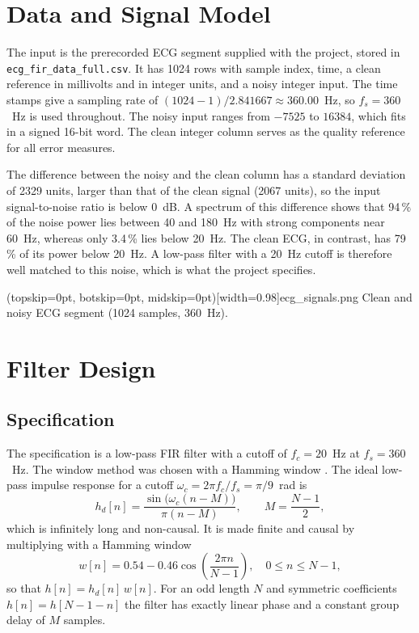 \documentclass{ieeeaccess}
\begin{document}
\section{Data and Signal Model}
\label{sec:data}
The input is the prerecorded ECG segment supplied with the project, stored in \texttt{ecg\_fir\_data\_full.csv}. It has 1024 rows with sample index, time, a clean reference in millivolts and in integer units, and a noisy integer input. The time stamps give a sampling rate of $(1024-1)/2.841667 \approx 360.00$~Hz, so $f_s = 360$~Hz is used throughout. The noisy input ranges from $-7525$ to $16384$, which fits in a signed 16-bit word. The clean integer column serves as the quality reference for all error measures.

The difference between the noisy and the clean column has a standard deviation of 2329 units, larger than that of the clean signal (2067 units), so the input signal-to-noise ratio is below 0~dB. A spectrum of this difference shows that 94\,\% of the noise power lies between 40 and 180~Hz with strong components near 60~Hz, whereas only 3.4\,\% lies below 20~Hz. The clean ECG, in contrast, has 79\,\% of its power below 20~Hz. A low-pass filter with a 20~Hz cutoff is therefore well matched to this noise, which is what the project specifies.

\Figure[t!](topskip=0pt, botskip=0pt, midskip=0pt)[width=0.98\columnwidth]{ecg_signals.png}
{Clean and noisy ECG segment (1024 samples, 360~Hz).\label{fig:signals}}

\section{Filter Design}
\label{sec:design}
\subsection{Specification}
The specification is a low-pass FIR filter with a cutoff of $f_c = 20$~Hz at $f_s = 360$~Hz. The window method \cite{b1} was chosen with a Hamming window \cite{b2}. The ideal low-pass impulse response for a cutoff $\omega_c = 2\pi f_c/f_s = \pi/9$~rad is
\begin{equation}
h_d[n] = \frac{\sin\!\big(\omega_c (n-M)\big)}{\pi (n-M)}, \qquad M = \frac{N-1}{2},
\end{equation}
which is infinitely long and non-causal. It is made finite and causal by multiplying with a Hamming window
\begin{equation}
w[n] = 0.54 - 0.46\cos\!\left(\frac{2\pi n}{N-1}\right), \quad 0 \le n \le N-1,
\end{equation}
so that $h[n] = h_d[n]\,w[n]$. For an odd length $N$ and symmetric coefficients $h[n]=h[N-1-n]$ the filter has exactly linear phase and a constant group delay of $M$ samples.
\end{document}
